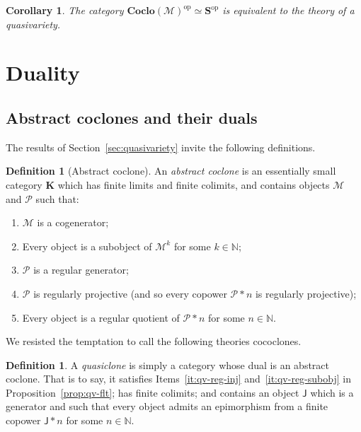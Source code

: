 \documentclass[11pt, a4paper, twoside,leqno]{amsart}
\newcommand{\cat}[1]{\mathbf{#1}}
\numberwithin{equation}{section}
\theoremstyle{plain}
\newtheorem{Cor}[Thm]{Corollary}
\theoremstyle{definition}
\newtheorem{Defn}[Thm]{Definition}
\begin{document}
\begin{Cor}
  \label{cor:cocloMop-qv-theory}
  The category \(\cat{Coclo}(\mathcal{M})^{\mathrm{op}}\simeq \cat{S}^{\mathrm{op}}\) is
  equivalent to the theory of a quasivariety.
\end{Cor}

\section{Duality}
\label{sec:duality}

\subsection{Abstract coclones and their duals}
\label{sec:ARClo-QClo}

The results of Section~\ref{sec:quasivariety} invite the following
definitions.

\begin{Defn}[Abstract coclone]
  \label{def:arc}
  An \emph{abstract coclone} is an essentially small category
  \(\cat{K}\) which has
  finite limits and finite colimits, and contains objects
  \(\mathcal{M}\) and \(\mathcal{P}\) such that: 
  \begin{enumerate}[label=(\alph*), ref=(\alph*)]
  \item
    \label{it:arc-cogen}
    \(\mathcal{M}\) is a cogenerator;

    \item
    \label{it:arc-sub-J}
    Every object is a subobject of \(\mathcal{M}^{k}\) for some \(k \in
    \mathbb{N}\);
    
  \item
    \label{it:arc-reg-gen}
    \(\mathcal{P}\) is a regular generator;
    
  \item 
    \label{it:arc-reg-proj}
    \(\mathcal{P}\) is regularly projective (and so every copower \(\mathcal{P}\ast n\) is
    regularly projective);

  \item
    \label{it:arc-reg-quot}
    Every object is a regular quotient of \(\mathcal{P}\ast n\) for some
    \(n \in \mathbb{N}\).  
  \end{enumerate}
\end{Defn}

We resisted the temptation to call the following theories cococlones.
\begin{Defn}
  \label{def:5}
  A \emph{quasiclone} is simply a category whose dual is an abstract
  coclone. That is to say, it 
  satisfies Items~\ref{it:qv-reg-inj}
  and~\ref{it:qv-reg-subobj} in Proposition~\ref{prop:qv-flt}; has
  finite colimits; and contains an object \(\mathsf{J}\) which is a
  generator and such that
  every object admits an epimorphism from a finite copower
  \(\mathsf{J}\ast n\) for some \(n\in \mathbb{N}
  \).
\end{Defn}
\end{document}
